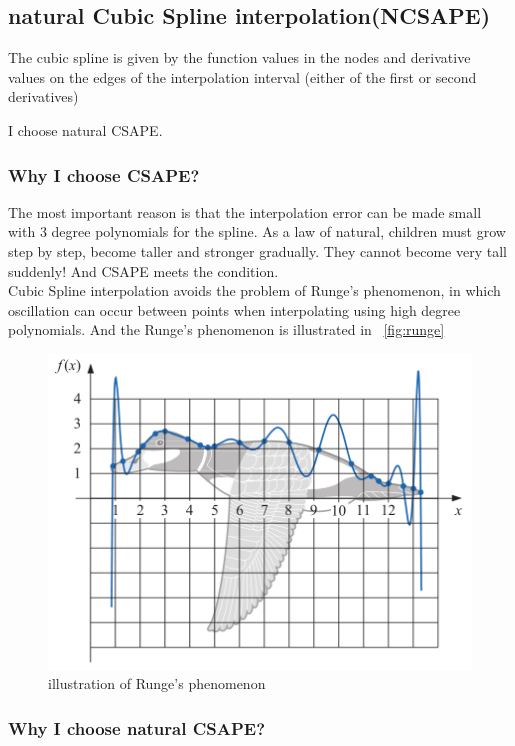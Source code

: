 \documentclass[
10pt, %
a4paper, %
oneside, %
headinclude,footinclude, %
BCOR5mm, %
]{scrartcl}
\begin{document}
\subsection{natural Cubic Spline interpolation(NCSAPE)}
\begin{definition}[CSAPE]
The cubic spline is given by the function values in the nodes and derivative values on the edges of the interpolation interval (either of the first or second derivatives)
\end{definition}
I choose natural CSAPE.
\subsubsection{Why I choose CSAPE?}
The most important reason is that the interpolation error can be made small with 3 degree polynomials for the spline. As a law of natural, children must grow step by step, become taller and stronger gradually. They cannot become very tall suddenly! And CSAPE meets the condition.
\\Cubic Spline interpolation avoids the problem of Runge's phenomenon, in which oscillation can occur between points when interpolating using high degree polynomials. And the Runge's phenomenon is illustrated in ~\vref{fig:runge}
\begin{figure}[tb]
\centering
\includegraphics[width=0.5\columnwidth]{./fig/runge.png}
\caption[illustration of Runge's phenomenon]{illustration of Runge's phenomenon}
\label{fig:runge}
\end{figure}
\subsubsection{Why I choose \textbf{natural} CSAPE?}
\end{document}

